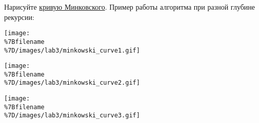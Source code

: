 Нарисуйте
\href{http://wikipedia.org/ru/\%D0\%9A\%D1\%80\%D0\%B8\%D0\%B2\%D0\%B0\%D1\%8F_\%D0\%9C\%D0\%B8\%D0\%BD\%D0\%BA\%D0\%BE\%D0\%B2\%D1\%81\%D0\%BA\%D0\%BE\%D0\%B3\%D0\%BE}{кривую
Минковского}. Пример работы алгоритма при разной глубине рекурсии:

\texttt{[image: \\\%7Bfilename\\\%7D/images/lab3/minkowski\_curve1.gif]}

\texttt{[image: \\\%7Bfilename\\\%7D/images/lab3/minkowski\_curve2.gif]}

\texttt{[image: \\\%7Bfilename\\\%7D/images/lab3/minkowski\_curve3.gif]}

\begin{Shaded}
\begin{Highlighting}[]
 

 
     \OperatorTok{==} \NormalTok{:}
    \OperatorTok{/}\NormalTok{)}
    \NormalTok{)}
    \OperatorTok{/}\NormalTok{)}
    \NormalTok{)}
    \OperatorTok{/}\NormalTok{)}
    \NormalTok{)}
    \OperatorTok{/}\NormalTok{)}
    \OperatorTok{/}\NormalTok{)}
    \NormalTok{)}
    \OperatorTok{/}\NormalTok{)}
    \NormalTok{)}
    \OperatorTok{/}\NormalTok{)}
    \NormalTok{)}
    \OperatorTok{/}\NormalTok{)}

\OperatorTok{=} 
\OperatorTok{=} 

\NormalTok{)}

\OperatorTok{-}\OperatorTok{/}\NormalTok{, }\NormalTok{)}

\end{Highlighting}
\end{Shaded}

